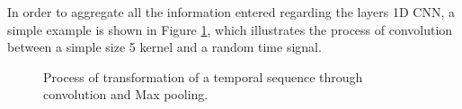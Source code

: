 In order to aggregate all the information entered regarding the layers {1D CNN}, a simple example is shown in Figure \ref{resdata}, which illustrates the process of convolution between a simple size 5 kernel and a random time signal.

\begin{figure}[h!]
\captionsetup[subfigure]{position=b}
\centering
{}
\caption{Process of transformation of a temporal sequence through convolution and Max pooling.}
\label{resdata}
\end{figure}


